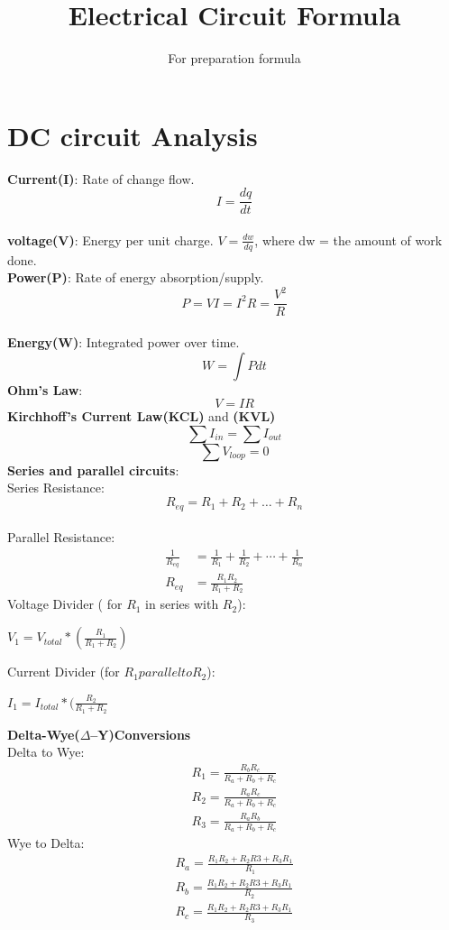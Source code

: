 \documentclass{article}
\title{Electrical Circuit Formula}
\author{For preparation formula}
\date{}
\begin{document}
\maketitle

\section{DC circuit Analysis}
\textbf{Current(I)}: Rate of change flow. $$I = \frac{dq}{dt}$$\\
\textbf{voltage(V)}: Energy per unit charge. $V = \frac{dw}{dq}$, where dw = the amount of work done.\\
\textbf{Power(P)}: Rate of energy absorption/supply. $$P = VI = I^2R = \frac{V^2}{R}$$\\
\textbf{Energy(W)}: Integrated power over time. $$W = \int{Pdt}$$
\textbf{Ohm's Law}: $$V = IR$$
\textbf{Kirchhoff's Current Law(KCL)} and \textbf{(KVL)}
\[
\sum I_{in} = \sum I_{out}
\]
\[
\sum V_{loop} = 0
\]
\textbf{ Series and parallel circuits}:\\
Series Resistance: $$R_{eq} = R_1 + R_2 +\dots + R_n $$\\
Parallel Resistance:
\begin{align}
\frac{1}{R_{eq}} &= \frac{1}{R_1}+\frac{1}{R_2}+\cdots+\frac{1}{R_n}\\
          R_{eq} &= \frac{R_1R_2}{R_1 + R_2}
\end{align}
Voltage Divider ( for $R_{1} $ in series with $ R_2$):
\begin{center}
    $V_1 = V_{total}*(\frac{R_1}{R_1 + R_2}) $
\end{center}
Current Divider (for $R_1 parallel to R_2$):
\begin{center}
    $ I_1 = I_{total}*(\frac{R_2}{R_1 + R_2}$
\end{center}
\textbf{Delta-Wye($\Delta$--Y)Conversions}\\
Delta to Wye:
\begin{align}
    R_1 = \frac{R_bR_c}{R_a + R_b + R_c}\\
    R_2 =\frac{R_aR_c}{R_a + R_b + R_c}\\
    R_3 =\frac{R_aR_b}{R_a + R_b + R_c}
\end{align}
Wye to Delta:
\begin{align}
    R_a =\frac{R_1R_2 + R_2R3 + R_3R_1}{R_1}\\
    R_b =\frac{R_1R_2 + R_2R3 + R_3R_1}{R_2}\\
    R_c =\frac{R_1R_2 + R_2R3 + R_3R_1}{R_3}
\end{align}
\end{document}
